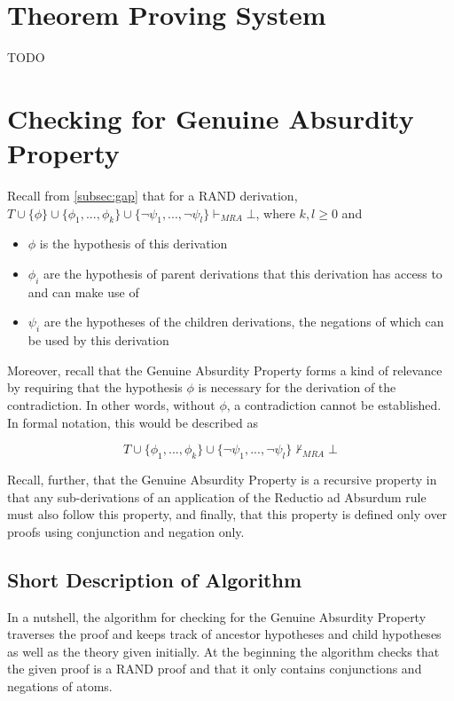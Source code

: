 \documentclass[11pt,twoside,a4paper]{report}
\begin{document}
\chapter{Theorem Proving System}
\label{chap:prover}
TODO

\chapter{Checking for Genuine Absurdity Property}
\label{chap:gapcheck}
Recall from \autoref{subsec:gap} that for a RAND derivation, $T\cup\{\phi\}\cup\{\phi_1, ..., \phi_k\}\cup\{\neg\psi_1, ..., \neg\psi_l\}\vdash_{MRA}\bot$, where $k, l \geq 0$ and

\begin{itemize}
\item
$\phi$ is the hypothesis of this derivation
\item
$\phi_i$ are the hypothesis of parent derivations that this derivation has access to and can make use of
\item
$\psi_i$ are the hypotheses of the children derivations, the negations of which can be used by this derivation
\end{itemize}

Moreover, recall that the Genuine Absurdity Property forms a kind of relevance by requiring that the hypothesis $\phi$ is necessary for the derivation of the contradiction. In other words, without $\phi$, a contradiction cannot be established. In formal notation, this would be described as

\[T\cup\{\phi_1, ..., \phi_k\}\cup\{\neg\psi_1, ..., \neg\psi_l\}\nvdash_{MRA}\bot\]

Recall, further, that the Genuine Absurdity Property is a recursive property in that any sub-derivations of an application of the Reductio ad Absurdum rule must also follow this property, and finally, that this property is defined only over proofs using conjunction and negation only.

\section{Short Description of Algorithm}
In a nutshell, the algorithm for checking for the Genuine Absurdity Property traverses the proof and keeps track of ancestor hypotheses and child hypotheses as well as the theory given initially. At the beginning the algorithm checks that the given proof is a RAND proof and that it only contains conjunctions and negations of atoms.
\end{document}
